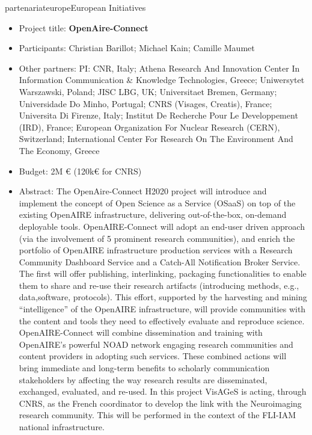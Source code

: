\documentclass{ra2018}
\begin{document}
\begin{module}{partenariat}{europe}{European Initiatives}
\begin{itemize}
        \item Project title: \textbf{OpenAire-Connect}
        \item Participants: Christian Barillot; Michael Kain; Camille Maumet
        \item Other partners: PI: CNR, Italy; Athena Research And Innovation Center In Information Communication \& Knowledge Technologies, Greece; Uniwersytet Warszawski, Poland; JISC LBG, UK; Universitaet Bremen, Germany; Universidade Do Minho, Portugal; CNRS (Visages, Creatis), France; Universita Di Firenze, Italy; Institut De Recherche Pour Le Developpement (IRD), France; European Organization For Nuclear Research (CERN), Switzerland; International Center For Research On The Environment And The Economy, Greece
        \item Budget: 2M € (120k€ for CNRS)
        \item Abstract:  The OpenAire-Connect H2020 project will introduce and implement the concept of Open Science as a Service (OSaaS) on top of the existing OpenAIRE infrastructure, delivering out-of-the-box, on-demand deployable tools. OpenAIRE-Connect will adopt an end-user driven approach (via the involvement of 5 prominent research communities), and enrich the portfolio of OpenAIRE infrastructure production services with a Research Community Dashboard Service and a Catch-All Notification Broker Service. The first will offer publishing, interlinking, packaging functionalities to enable them to share and re-use their research artifacts (introducing methods, e.g., data,software, protocols). This effort, supported by the harvesting and mining “intelligence” of the OpenAIRE infrastructure, will provide communities with the content and tools they need to effectively evaluate and reproduce science. OpenAIRE-Connect will combine dissemination and training with OpenAIRE's powerful NOAD network engaging research communities and content providers in adopting such services. These combined actions will bring immediate and long-term benefits to scholarly communication stakeholders by affecting the way research results are disseminated, exchanged, evaluated, and re-used. In this project VisAGeS is acting, through CNRS, as the French coordinator to develop the link with the Neuroimaging research community. This will be performed in the context of the FLI-IAM national infrastructure.
\end{itemize}



\end{module}
\end{document}
